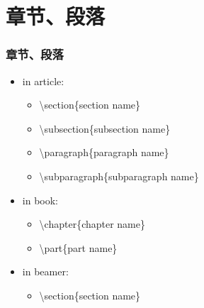 \section{章节、段落}
\begin{frame}[fragile]\frametitle{章节、段落}
    \begin{itemize}
      \item<1->in article:
        \begin{itemize}
              \item<2->  \textbackslash section\{section name\}
              \item<3->  \textbackslash subsection\{subsection name\}
              \item<4->  \textbackslash paragraph\{paragraph name\}
              \item<5->  \textbackslash subparagraph\{subparagraph name\}
        \end{itemize}
      \item<6->in book:
        \begin{itemize}
              \item<7->  \textbackslash chapter\{chapter name\}
              \item<8->  \textbackslash part\{part name\}
        \end{itemize}
      \item<9->in beamer:
        \begin{itemize}
              \item<10->  \textbackslash section\{section name\}
        \end{itemize}
    \end{itemize}
\end{frame}
